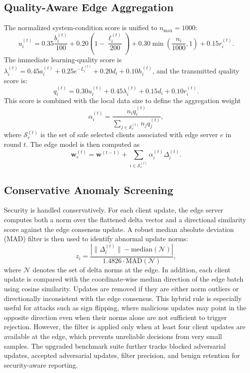 \documentclass[conference]{IEEEtran}
\begin{document}
\subsection{Quality-Aware Edge Aggregation}
The normalized system-condition score is unified to $n_{\max}=1000$:
\begin{equation}
u_i^{(t)} = 0.35 \frac{b_i^{(t)}}{100} + 0.20\left(1 - \frac{\ell_i^{(t)}}{200}\right) + 0.30 \min\left(\frac{n_i}{1000},1\right) + 0.15 r_i^{(t)}.
\end{equation}
The immediate learning-quality score is $\lambda_i^{(t)} = 0.45 a_i^{(t)} + 0.25 e^{-L_i^{(t)}} + 0.20 d_i + 0.10 h_i^{(t)}$, and the transmitted quality score is:
\begin{equation}
q_i^{(t)} = 0.30 u_i^{(t)} + 0.45 \lambda_i^{(t)} + 0.15 d_i + 0.10 r_i^{(t)}.
\end{equation}
This score is combined with the local data size to define the aggregation weight
\begin{equation}
\alpha_i^{(t)} = \frac{n_i q_i^{(t)}}{\sum_{j \in \mathcal{S}_e^{(t)}} n_j q_j^{(t)}},
\end{equation}
where $\mathcal{S}_e^{(t)}$ is the set of safe selected clients associated with edge server $e$ in round $t$. The edge model is then computed as
\begin{equation}
\mathbf{w}_e^{(t)} = \mathbf{w}^{(t-1)} + \sum_{i \in \mathcal{S}_e^{(t)}} \alpha_i^{(t)} \Delta_i^{(t)}.
\end{equation}

\subsection{Conservative Anomaly Screening}
Security is handled conservatively. For each client update, the edge server computes both a norm over the flattened delta vector and a directional similarity score against the edge consensus update. A robust median absolute deviation (MAD) filter is then used to identify abnormal update norms:
\begin{equation}
z_i = \frac{\left|\|\Delta_i^{(t)}\| - \mathrm{median}(\mathcal{N})\right|}{1.4826 \cdot \mathrm{MAD}(\mathcal{N})},
\end{equation}
where $\mathcal{N}$ denotes the set of delta norms at the edge. In addition, each client update is compared with the coordinate-wise median direction of the edge batch using cosine similarity. Updates are removed if they are either norm outliers or directionally inconsistent with the edge consensus. This hybrid rule is especially useful for attacks such as sign flipping, where malicious updates may point in the opposite direction even when their norms alone are not sufficient to trigger rejection. However, the filter is applied only when at least four client updates are available at the edge, which prevents unreliable decisions from very small samples. The upgraded benchmark suite further tracks blocked adversarial updates, accepted adversarial updates, filter precision, and benign retention for security-aware reporting.
\end{document}
